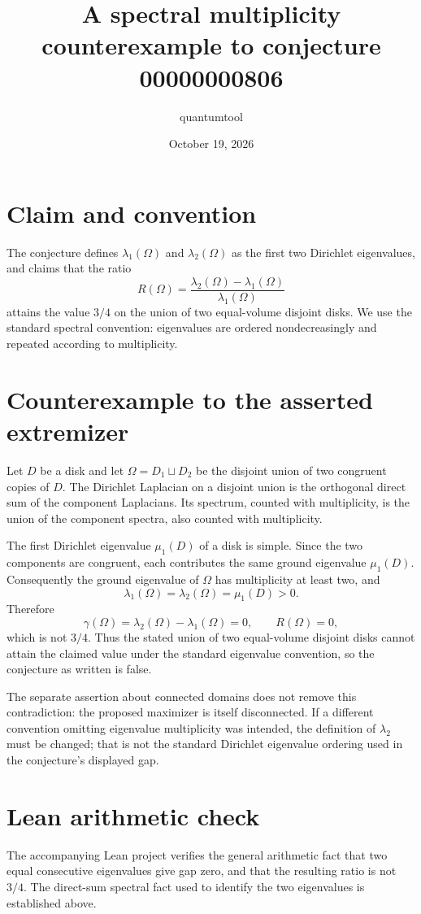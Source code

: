 \documentclass[11pt]{article}
\title{A spectral multiplicity counterexample to conjecture 00000000806}
\author{quantumtool}
\date{October 19, 2026}
\begin{document}
\maketitle

\section*{Claim and convention}
The conjecture defines $\lambda_1(\Omega)$ and $\lambda_2(\Omega)$ as the first two Dirichlet eigenvalues, and claims that the ratio
\[
R(\Omega)=\frac{\lambda_2(\Omega)-\lambda_1(\Omega)}{\lambda_1(\Omega)}
\]
attains the value $3/4$ on the union of two equal-volume disjoint disks. We use the standard spectral convention: eigenvalues are ordered nondecreasingly and repeated according to multiplicity.

\section*{Counterexample to the asserted extremizer}
Let $D$ be a disk and let $\Omega=D_1\sqcup D_2$ be the disjoint union of two congruent copies of $D$. The Dirichlet Laplacian on a disjoint union is the orthogonal direct sum of the component Laplacians. Its spectrum, counted with multiplicity, is the union of the component spectra, also counted with multiplicity.

The first Dirichlet eigenvalue $\mu_1(D)$ of a disk is simple. Since the two components are congruent, each contributes the same ground eigenvalue $\mu_1(D)$. Consequently the ground eigenvalue of $\Omega$ has multiplicity at least two, and
\[
\lambda_1(\Omega)=\lambda_2(\Omega)=\mu_1(D)>0.
\]
Therefore
\[
\gamma(\Omega)=\lambda_2(\Omega)-\lambda_1(\Omega)=0,
\qquad R(\Omega)=0,
\]
which is not $3/4$. Thus the stated union of two equal-volume disjoint disks cannot attain the claimed value under the standard eigenvalue convention, so the conjecture as written is false.

The separate assertion about connected domains does not remove this contradiction: the proposed maximizer is itself disconnected. If a different convention omitting eigenvalue multiplicity was intended, the definition of $\lambda_2$ must be changed; that is not the standard Dirichlet eigenvalue ordering used in the conjecture's displayed gap.

\section*{Lean arithmetic check}
The accompanying Lean project verifies the general arithmetic fact that two equal consecutive eigenvalues give gap zero, and that the resulting ratio is not $3/4$. The direct-sum spectral fact used to identify the two eigenvalues is established above.
\end{document}
